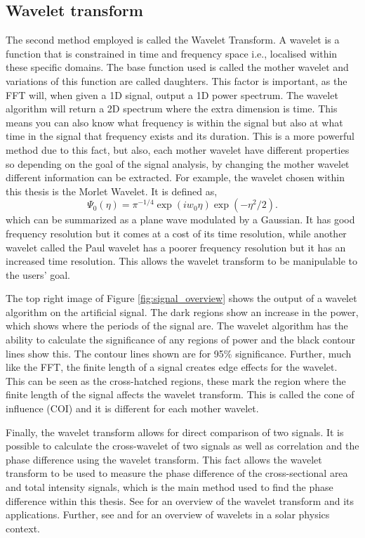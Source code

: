 \subsection{Wavelet transform}

	The second method employed is called the Wavelet Transform.
	A wavelet is a function that is constrained in time and frequency space i.e., localised within these specific domains.
	The base function used is called the mother wavelet and variations of this function are called daughters.
	This factor is important, as the FFT will, when given a 1D signal, output a 1D power spectrum.
	The wavelet algorithm will return a 2D spectrum where the extra dimension is time.
	This means you can also know what frequency is within the signal but also at what time in the signal that frequency exists and its duration.
	This is a more powerful method due to this fact, but also, each mother wavelet have different properties so depending on the goal of the signal analysis, by changing the mother wavelet different information can be extracted. 
	For example, the wavelet chosen within this thesis is the Morlet Wavelet.
	It is defined as,
	\begin{equation}
		\Psi_0(\eta) = \pi^{-1/4} \exp(iw_0\eta)\exp(-\eta^2/2).
	\end{equation}
    which can be summarized as a plane wave modulated by a Gaussian.
	It has good frequency resolution but it comes at a cost of its time resolution, while another wavelet called the Paul wavelet has a poorer frequency resolution but it has an increased time resolution.
	This allows the wavelet transform to be manipulable to the users' goal.
    
    The top right image of Figure \ref{fig:signal_overview} shows the output of a wavelet algorithm on the artificial signal.
    The dark regions show an increase in the power, which shows where the periods of the signal are.
    The wavelet algorithm has the ability to calculate the significance of any regions of power and the black contour lines show this.
    The contour lines shown are for 95\% significance. 
    Further, much like the FFT, the finite length of a signal creates edge effects for the wavelet.
    This can be seen as the cross-hatched regions, these mark the region where the finite length of the signal affects the wavelet transform.
    This is called the cone of influence (COI) and it is different for each mother wavelet.
    
    Finally, the wavelet transform allows for direct comparison of two signals.
    It is possible to calculate the cross-wavelet of two signals as well as correlation and the phase difference using the wavelet transform.
    This fact allows the wavelet transform to be used to measure the phase difference of the cross-sectional area and total intensity signals, which is the main method used to find the phase difference within this thesis.
    See \cite{torrence} for an overview of the wavelet transform and its applications.
    Further, see \cite{2004SoPh..222..203D} and \cite{WAUO} for an overview of wavelets in a solar physics context.
    
